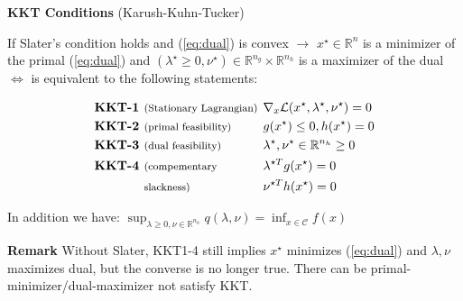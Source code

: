 \begin{sstTitleBox}[BrickRed]{\textbf{\large
			KKT  Conditions}
		\normalsize(Karush-Kuhn-Tucker)}
	\begin{theorem}
		\begin{centering}
			If Slater's condition holds and
			(\ref{eq:dual}) is convex
			$\rightarrow$
			$x^\star \in \mathbb{R}^{n}$ is a minimizer of the primal (\ref{eq:dual})
			and $(\lambda^\star\ge0,\nu^\star)\in\mathbb{R}^{n_g}\times\mathbb{R}^{n_h}$
			is a maximizer of the dual $\Leftrightarrow$
			is equivalent to the following statements:
			\begin{sstFrame}[BrickRed]
				\vspace{-3mm}
				\color{white}
				\small
				\[\begin{aligned}
						\textbf{KKT-1 } & \text{\footnotesize (Stationary Lagrangian)} \hspace{-2mm} &  & \nabla_x\mathcal{L}(x^\star,\lambda^\star,\nu^\star)  =  0
						\\
						\textbf{KKT-2 } & \text{\footnotesize (primal feasibility)}                  &  & g(x^\star)\le0, h(x^\star)                            =                            0
						\\
						\textbf{KKT-3 } & \text{\footnotesize (dual feasibility)}                    &  & \lambda^\star  , \nu^\star \in \mathbb{R}^{n_h}       \ge       0
						\\
						\textbf{KKT-4 } & \text{\footnotesize (compementary}                         &  & \lambda^{\star T} g(x^\star)                          =                          0
						\\
						                & \text{\footnotesize slackness)}                            &  & \nu^{\star T} h(x^\star)                              =  0
					\end{aligned}\]
				\vspace{-4mm}
			\end{sstFrame}
			In addition we have:
			$\sup_{\lambda\ge0,\nu\in\mathbb{R}^{n_h}}q(\lambda,\nu)=\inf_{x\in\mathcal{C}}f(x)$
		\end{centering}
	\end{theorem}
\end{sstTitleBox}

\textbf{Remark} Without Slater,
KKT1-4 still implies $x^\star$ minimizes (\ref{eq:dual})
and $\lambda,\nu$ maximizes dual,
but the converse is no longer true.
There can be primal-minimizer/dual-maximizer not satisfy KKT.


